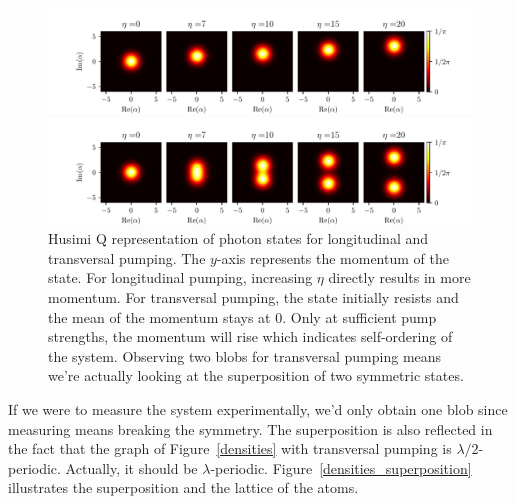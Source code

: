 \begin{figure}[!htb]
	\begin{minipage}[b]{1\linewidth}
	\centering
	\includegraphics[width=1\textwidth]{images/qfunc_long.pdf}
	\end{minipage}
%
	\begin{minipage}[b]{1\linewidth}
	\centering
	\includegraphics[width=1\textwidth]{images/qfunc_trans.pdf}
	\end{minipage}
\caption{Husimi Q representation of photon states for longitudinal and transversal pumping. The $y$-axis represents the momentum of the state. For longitudinal pumping, increasing $\eta$ directly results in more momentum. For transversal pumping, the state initially resists and the mean of the momentum stays at 0. Only at sufficient pump strengths, the momentum will rise which indicates self-ordering of the system. Observing two blobs for transversal pumping means we're actually looking at the superposition of two symmetric states.}
\label{qfunc}
\end{figure}
\FloatBarrier

\noindent If we were to measure the system experimentally, we'd only obtain one blob since measuring means breaking the symmetry. The superposition is also reflected in the fact that the graph of Figure~\ref{densities} with transversal pumping is $\lambda / 2$-periodic. Actually, it should be $\lambda$-periodic. Figure~\ref{densities_superposition} illustrates the superposition and the lattice of the atoms.

